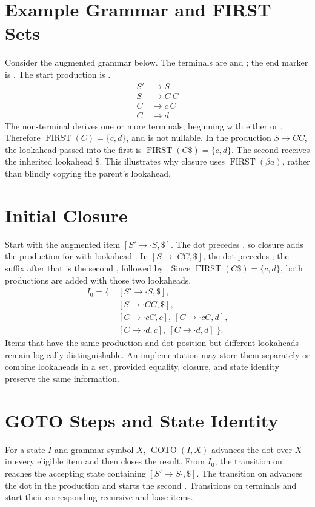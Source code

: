 \documentclass[12pt,a4paper,oneside]{report}
\newcommand{\code}[1]{\texttt{\detokenize{#1}}}
\begin{document}
\section{Example Grammar and FIRST Sets}
Consider the augmented grammar below. The terminals are \code{c} and \code{d}; the end marker is \code{$}. The start production is \code{S' -> S}.
\begin{align*}
S' &\rightarrow S \\
S &\rightarrow C\ C \\
C &\rightarrow c\ C \\
C &\rightarrow d
\end{align*}
The non-terminal \code{C} derives one or more terminals, beginning with either \code{c} or \code{d}. Therefore \(\operatorname{FIRST}(C)=\{c,d\}\), and \code{C} is not nullable. In the production \(S\rightarrow C C\), the lookahead passed into the first \code{C} is \(\operatorname{FIRST}(C\$)=\{c,d\}\). The second \code{C} receives the inherited lookahead \(\$\). This illustrates why closure uses \(\operatorname{FIRST}(\beta a)\), rather than blindly copying the parent's lookahead.

\section{Initial Closure}
Start with the augmented item \([S'\rightarrow\cdot S,\$]\). The dot precedes \code{S}, so closure adds the production for \code{S} with lookahead \code{$}. In \([S\rightarrow\cdot C C,\$]\), the dot precedes \code{C}; the suffix after that \code{C} is the second \code{C}, followed by \code{$}. Since \(\operatorname{FIRST}(C\$)=\{c,d\}\), both \code{C} productions are added with those two lookaheads.
\begin{align*}
I_0=\{\;&[S'\rightarrow\cdot S,\$],\\
 &[S\rightarrow\cdot C C,\$],\\
 &[C\rightarrow\cdot c C,c],\ [C\rightarrow\cdot c C,d],\\
 &[C\rightarrow\cdot d,c],\ [C\rightarrow\cdot d,d]\;\}.
\end{align*}
Items that have the same production and dot position but different lookaheads remain logically distinguishable. An implementation may store them separately or combine lookaheads in a set, provided equality, closure, and state identity preserve the same information.

\section{GOTO Steps and State Identity}
For a state \(I\) and grammar symbol \(X\), \(\operatorname{GOTO}(I,X)\) advances the dot over \(X\) in every eligible item and then closes the result. From \(I_0\), the transition on \code{S} reaches the accepting state containing \([S'\rightarrow S\cdot,\$]\). The transition on \code{C} advances the dot in the \code{S} production and starts the second \code{C}. Transitions on terminals \code{c} and \code{d} start their corresponding recursive and base items.
\end{document}

